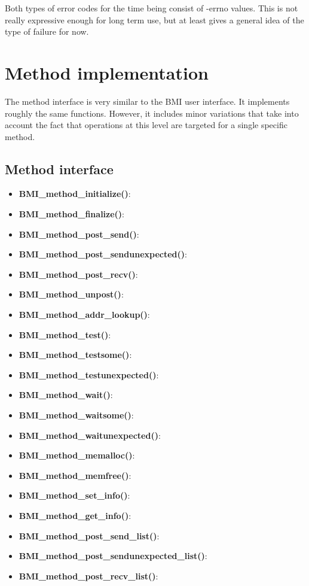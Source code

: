 \documentclass[11pt]{article}
\begin{document}
Both types of error codes for the time being consist of -errno
values.  This is not really expressive enough for long term use,
but at least gives a general idea of the type of failure for now.

\section{Method implementation}
\label{sec:methguide}

The method interface is very similar to the BMI user interface.
It implements roughly the same functions. However, it includes minor
variations that take into account the fact that operations at this level
are targeted for a single specific method.

\subsection{Method interface}

\begin{itemize}

\item \textbf{BMI\_method\_initialize()}:
\item \textbf{BMI\_method\_finalize()}:
\item \textbf{BMI\_method\_post\_send()}:
\item \textbf{BMI\_method\_post\_sendunexpected()}:
\item \textbf{BMI\_method\_post\_recv()}:
\item \textbf{BMI\_method\_unpost()}: 
\item \textbf{BMI\_method\_addr\_lookup()}:
\item \textbf{BMI\_method\_test()}: 
\item \textbf{BMI\_method\_testsome()}: 
\item \textbf{BMI\_method\_testunexpected()}:
\item \textbf{BMI\_method\_wait()}: 
\item \textbf{BMI\_method\_waitsome()}: 
\item \textbf{BMI\_method\_waitunexpected()}:
\item \textbf{BMI\_method\_memalloc()}:
\item \textbf{BMI\_method\_memfree()}:
\item \textbf{BMI\_method\_set\_info()}:
\item \textbf{BMI\_method\_get\_info()}:
\item \textbf{BMI\_method\_post\_send\_list()}:
\item \textbf{BMI\_method\_post\_sendunexpected\_list()}:
\item \textbf{BMI\_method\_post\_recv\_list()}:

\end{itemize}
\end{document}
